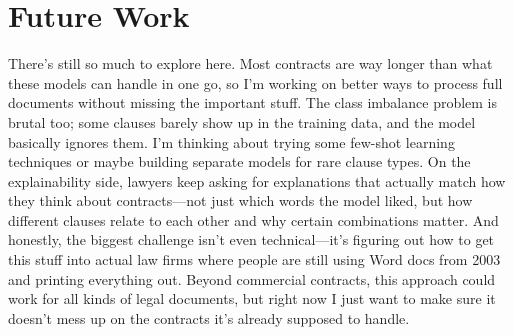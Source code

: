 \section{Future Work}
\label{sec:future_work}

There's still so much to explore here. Most contracts are way longer than what these models can handle in one go, so I'm working on better ways to process full documents without missing the important stuff. The class imbalance problem is brutal too; some clauses barely show up in the training data, and the model basically ignores them. I'm thinking about trying some few-shot learning techniques or maybe building separate models for rare clause types. On the explainability side, lawyers keep asking for explanations that actually match how they think about contracts—not just which words the model liked, but how different clauses relate to each other and why certain combinations matter. And honestly, the biggest challenge isn't even technical—it's figuring out how to get this stuff into actual law firms where people are still using Word docs from 2003 and printing everything out. Beyond commercial contracts, this approach could work for all kinds of legal documents, but right now I just want to make sure it doesn't mess up on the contracts it's already supposed to handle.